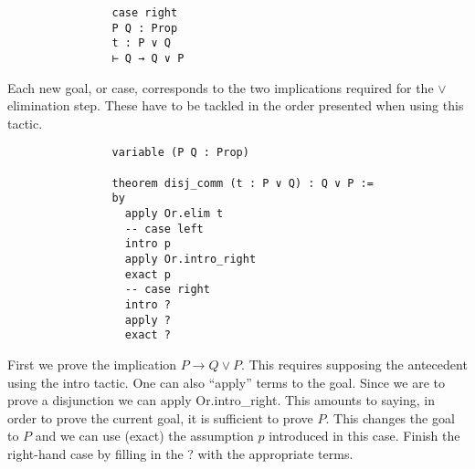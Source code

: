 \documentclass{book}
\begin{document}
\begin{eg}
\begin{center}
\begin{lstlisting}
                case right
                P Q : Prop
                t : P ∨ Q
                ⊢ Q → Q ∨ P
            \end{lstlisting}            
        \end{center}
        Each new goal, or case, corresponds to the two implications required for the $\lor$ elimination step. These have to be tackled in the order presented when using this tactic.
        \begin{center}
            \begin{lstlisting}
                variable (P Q : Prop)
                
                theorem disj_comm (t : P ∨ Q) : Q ∨ P :=
                by
                  apply Or.elim t
                  -- case left 
                  intro p
                  apply Or.intro_right
                  exact p
                  -- case right
                  intro ?
                  apply ?
                  exact ?
            \end{lstlisting}            
        \end{center} 
        First we prove the implication $P \to Q \lor P$. This requires supposing the antecedent using the intro tactic. One can also ``apply'' terms to the goal. Since we are to prove a disjunction we can apply Or.intro\_right. This amounts to saying, in order to prove the current goal, it is sufficient to prove $P$. This changes the goal to $P$ and we can use (exact) the assumption $p$ introduced in this case. Finish the right-hand case by filling in the ? with the appropriate terms. 
    \end{eg}
\end{document}
